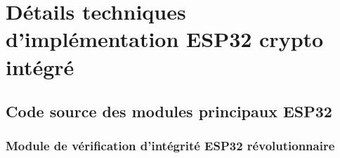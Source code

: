 
\appendix

\chapter{Détails techniques d'implémentation ESP32 crypto intégré}
\label{app:technical-details}

\section{Code source des modules principaux ESP32}

\subsection{Module de vérification d'intégrité ESP32 révolutionnaire}

